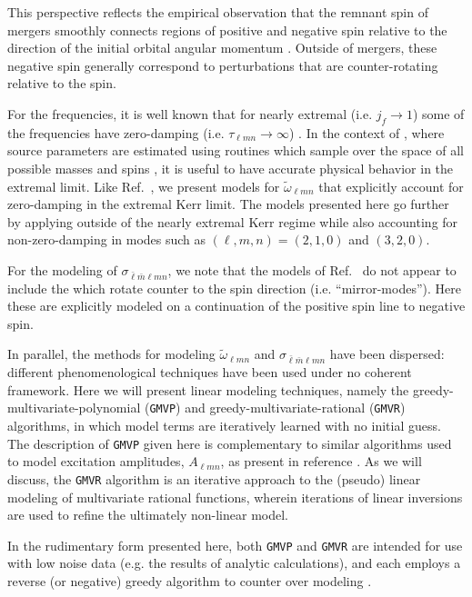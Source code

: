\documentclass[twocolumn,aps,prd,floatfix,preprintnumbers,a4paper,nofootinbib,
superscriptaddress,10pt]{revtex4-1}
\newcommand{\cw}{\tilde{\omega}}
\def\jf{j_f}
\def\lmn{_{\ell m n}}
\def\LMlmn{_{\bar{\ell} \bar{m} \ell m n}}
\def\gmvp#1{greedy-multivariate-polynomial#1
  (\texttt{GMVP}#1)\gdef\gmvp{\texttt{GMVP}}}
\def\gmvr#1{greedy-multivariate-rational#1
  (\texttt{GMVR}#1)\gdef\gmvr{\texttt{GMVR}}}
\begin{document}
%
This perspective reflects the empirical observation that the remnant spin of \bbh{} mergers smoothly connects regions of positive and negative spin relative to the direction of the initial orbital angular momentum \cite{Husa:2015iqa,London:2018gaq}.
%
Outside of \bbh{} mergers, these negative spin  generally correspond to perturbations that are counter-rotating relative to the \bh{} spin.
%
\par For the \qnm{} frequencies, it is well known that for nearly extremal  (i.e. $\jf \rightarrow 1$) some of the frequencies have zero-damping (i.e. $\tau\lmn \rightarrow \infty$) \cite{Yang:2012pj,Zimmerman:2015trm}.
%
In the context of \gw{} \da{}, where source parameters are estimated using routines which sample over the space of all possible \bh{} masses and spins \cite{TheLIGOScientific:2016wfe}, it is useful to have accurate physical behavior in the extremal limit.
%
Like Ref.~\cite{Cook:2014cta}, we present models for $\cw\lmn$ that explicitly account for zero-damping in the extremal Kerr limit.
%
The models presented here go further by applying outside of the nearly extremal Kerr regime while also accounting for non-zero-damping in modes such as $(\ell,m,n)=(2,1,0)$ and $(3,2,0)$\cite{Yang:2012pj}.
%
%
\par For the modeling of $\sigma\LMlmn$, we note that the models of Ref.~\cite{Berti:2014fga} do not appear to include the  which rotate counter to the \bh{} spin direction (i.e. ``mirror-modes'').
%
Here these \qnm{} are explicitly modeled on a continuation of the positive spin line to negative spin.
%
%
\par In parallel, the methods for modeling $\cw\lmn$ and $\sigma\LMlmn$ have been dispersed: different phenomenological techniques have been used under no coherent framework.
%
Here we will present linear modeling techniques, namely the \gmvp{} and \gmvr{} algorithms, in which model terms are iteratively learned with no initial guess.
%
The description of \gmvp{} given here is complementary to similar algorithms used to model \qnm{} excitation amplitudes, $A\lmn$, as present in reference \cite{Carullo:2018sfu,London:2018gaq,London:2014cma}.
%
As we will discuss, the \gmvr{} algorithm is an iterative approach to the (pseudo) linear modeling of multivariate rational functions, wherein iterations of linear inversions are used to refine the ultimately non-linear model.
%
\par In the rudimentary form presented here, both \gmvp{} and \gmvr{} are intended for use with low noise data (e.g. the results of analytic calculations), and each employs a reverse (or negative) greedy algorithm to counter over modeling \cite{Field:2011mf,Caudill:2011kv}.
\end{document}
